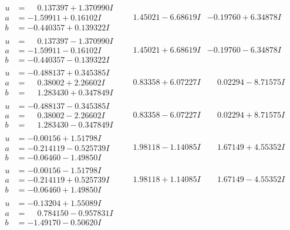 \documentclass[1p]{elsarticle_modified}
\theoremstyle{definition}
\begin{document}
$$\begin{array}{c|c|c}
\begin{aligned}
u &= \phantom{-}0.137397 + 1.370990 I \\
a &= -1.59911 + 0.16102 I \\
b &= -0.440357 + 0.139322 I\end{aligned}
 & \phantom{-}1.45021 - 6.68619 I & -0.19760 + 6.34878 I \\ \hline\begin{aligned}
u &= \phantom{-}0.137397 - 1.370990 I \\
a &= -1.59911 - 0.16102 I \\
b &= -0.440357 - 0.139322 I\end{aligned}
 & \phantom{-}1.45021 + 6.68619 I & -0.19760 - 6.34878 I \\ \hline\begin{aligned}
u &= -0.488137 + 0.345385 I \\
a &= \phantom{-}0.38002 + 2.26602 I \\
b &= \phantom{-}1.283430 + 0.347849 I\end{aligned}
 & \phantom{-}0.83358 + 6.07227 I & \phantom{-}0.02294 - 8.71575 I \\ \hline\begin{aligned}
u &= -0.488137 - 0.345385 I \\
a &= \phantom{-}0.38002 - 2.26602 I \\
b &= \phantom{-}1.283430 - 0.347849 I\end{aligned}
 & \phantom{-}0.83358 - 6.07227 I & \phantom{-}0.02294 + 8.71575 I \\ \hline\begin{aligned}
u &= -0.00156 + 1.51798 I \\
a &= -0.214119 - 0.525739 I \\
b &= -0.06460 - 1.49850 I\end{aligned}
 & \phantom{-}1.98118 - 1.14085 I & \phantom{-}1.67149 + 4.55352 I \\ \hline\begin{aligned}
u &= -0.00156 - 1.51798 I \\
a &= -0.214119 + 0.525739 I \\
b &= -0.06460 + 1.49850 I\end{aligned}
 & \phantom{-}1.98118 + 1.14085 I & \phantom{-}1.67149 - 4.55352 I \\ \hline\begin{aligned}
u &= -0.13204 + 1.55089 I \\
a &= \phantom{-}0.784150 - 0.957831 I \\
b &= -1.49170 - 0.50620 I\end{aligned}

\end{array}$$
\end{document}

